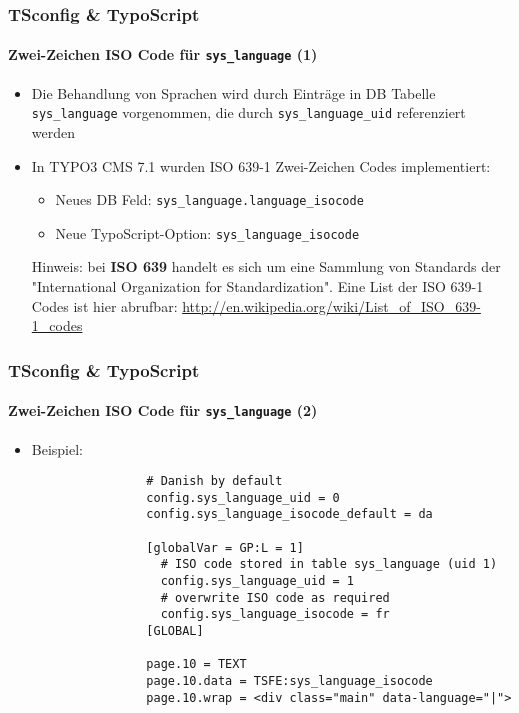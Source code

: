 \begin{frame}[fragile]
	\frametitle{TSconfig \& TypoScript}
	\framesubtitle{Zwei-Zeichen ISO Code für \texttt{sys\_language} (1)}

	\begin{itemize}
		\item Die Behandlung von Sprachen wird durch Einträge in DB Tabelle
			\texttt{sys\_language} vorgenommen, die durch \texttt{sys\_language\_uid}
			referenziert werden
		\item In TYPO3 CMS 7.1 wurden ISO 639-1 Zwei-Zeichen Codes implementiert:

			\begin{itemize}
				\item Neues DB Feld: \texttt{sys\_language.language\_isocode}
				\item Neue TypoScript-Option: \texttt{sys\_language\_isocode}
			\end{itemize}

		\vspace{0.2cm}

		\small
			Hinweis: bei \textbf{ISO 639} handelt es sich um eine Sammlung von
			Standards der "International Organization for Standardization".
			Eine List der ISO 639-1 Codes ist hier abrufbar:\newline
			\url{http://en.wikipedia.org/wiki/List_of_ISO_639-1_codes}
		\normalsize

	\end{itemize}

\end{frame}


\begin{frame}[fragile]
	\frametitle{TSconfig \& TypoScript}
	\framesubtitle{Zwei-Zeichen ISO Code für \texttt{sys\_language} (2)}

	\begin{itemize}
		\item Beispiel:

			\begin{lstlisting}
				# Danish by default
				config.sys_language_uid = 0
				config.sys_language_isocode_default = da

				[globalVar = GP:L = 1]
				  # ISO code stored in table sys_language (uid 1)
				  config.sys_language_uid = 1
				  # overwrite ISO code as required
				  config.sys_language_isocode = fr
				[GLOBAL]

				page.10 = TEXT
				page.10.data = TSFE:sys_language_isocode
				page.10.wrap = <div class="main" data-language="|">
			\end{lstlisting}

	\end{itemize}

\end{frame}

